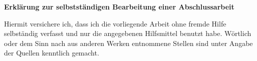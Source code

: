 \clearpage
\thispagestyle{plain}
\ITocEntryStatement
\textbf{\sffamily\large Erklärung zur selbstständigen Bearbeitung einer Abschlussarbeit}

Hiermit versichere ich, dass ich die vorliegende
Arbeit ohne fremde Hilfe selbständig verfasst und nur die
angegebenen Hilfsmittel benutzt habe.
Wörtlich oder dem Sinn nach aus anderen Werken entnommene Stellen sind unter
Angabe der Quellen kenntlich gemacht.

\vspace{1cm}
\noindent\makebox[3cm]{\hrulefill} \hspace{0.1cm}
    \makebox[3cm]{\hrulefill} \hspace{0.1cm}
    \makebox[6cm]{\hrulefill} \\
\noindent{} \hspace{0.1cm}
     \hspace{0.1cm}

\clearpage
